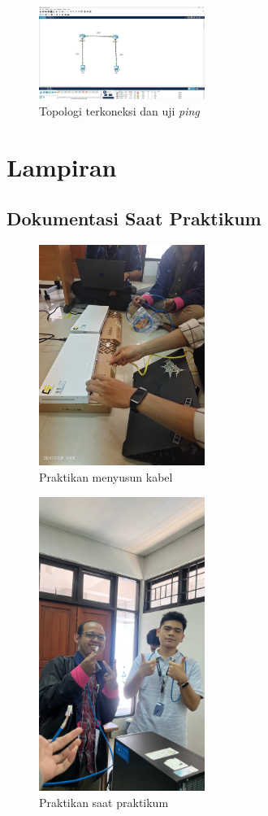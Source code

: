 \begin{figure}[H]
    \centering
    \includegraphics[width=0.48\textwidth]{img/TM8.jpeg}
    \caption{Topologi terkoneksi dan uji \textit{ping}}
    \label{fig:tm8}
\end{figure}

\newpage
\section{Lampiran}

\subsection{Dokumentasi Saat Praktikum}

\begin{figure}[H]
    \centering
    \includegraphics[width=0.48\textwidth]{img/Lampiran1.jpeg}
    \caption{Praktikan menyusun kabel}
    \label{fig:lmp1}
\end{figure}

\begin{figure}[H]
    \centering
    \includegraphics[width=0.48\textwidth]{img/Lampiran2.jpeg}
    \caption{Praktikan saat praktikum}
    \label{fig:lmp2}
\end{figure}



